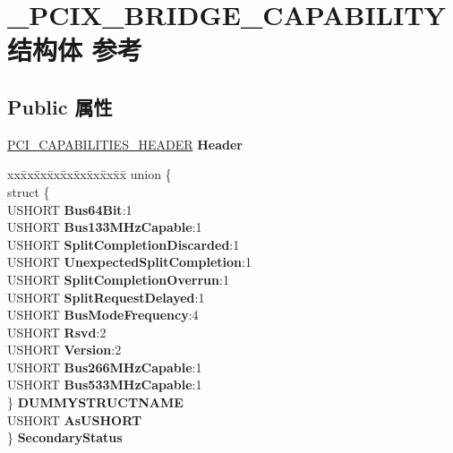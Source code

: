 \hypertarget{struct___p_c_i_x___b_r_i_d_g_e___c_a_p_a_b_i_l_i_t_y}{}\section{\+\_\+\+P\+C\+I\+X\+\_\+\+B\+R\+I\+D\+G\+E\+\_\+\+C\+A\+P\+A\+B\+I\+L\+I\+T\+Y结构体 参考}
\label{struct___p_c_i_x___b_r_i_d_g_e___c_a_p_a_b_i_l_i_t_y}
\subsection*{Public 属性}
\begin{DoxyCompactItemize}
\item 
\mbox{\label{struct___p_c_i_x___b_r_i_d_g_e___c_a_p_a_b_i_l_i_t_y_a537e3085e05b75888d80ff79475d0a23}} 
\hyperlink{struct___p_c_i___c_a_p_a_b_i_l_i_t_i_e_s___h_e_a_d_e_r}{P\+C\+I\+\_\+\+C\+A\+P\+A\+B\+I\+L\+I\+T\+I\+E\+S\+\_\+\+H\+E\+A\+D\+ER} {\bfseries Header}
\item 
\mbox{\label{struct___p_c_i_x___b_r_i_d_g_e___c_a_p_a_b_i_l_i_t_y_a3ccf2a6a062eae74a9b7432ff8d2ca84}} 
\begin{tabbing}
xx\=xx\=xx\=xx\=xx\=xx\=xx\=xx\=xx\=\kill
union \{\\
\>struct \{\\
\>\>USHORT {\bfseries Bus64Bit}:1\\
\>\>USHORT {\bfseries Bus133MHzCapable}:1\\
\>\>USHORT {\bfseries SplitCompletionDiscarded}:1\\
\>\>USHORT {\bfseries UnexpectedSplitCompletion}:1\\
\>\>USHORT {\bfseries SplitCompletionOverrun}:1\\
\>\>USHORT {\bfseries SplitRequestDelayed}:1\\
\>\>USHORT {\bfseries BusModeFrequency}:4\\
\>\>USHORT {\bfseries Rsvd}:2\\
\>\>USHORT {\bfseries Version}:2\\
\>\>USHORT {\bfseries Bus266MHzCapable}:1\\
\>\>USHORT {\bfseries Bus533MHzCapable}:1\\
\>\} {\bfseries DUMMYSTRUCTNAME}\\
\>USHORT {\bfseries AsUSHORT}\\
\} {\bfseries SecondaryStatus}\\


\end{tabbing}
\end{DoxyCompactItemize}

